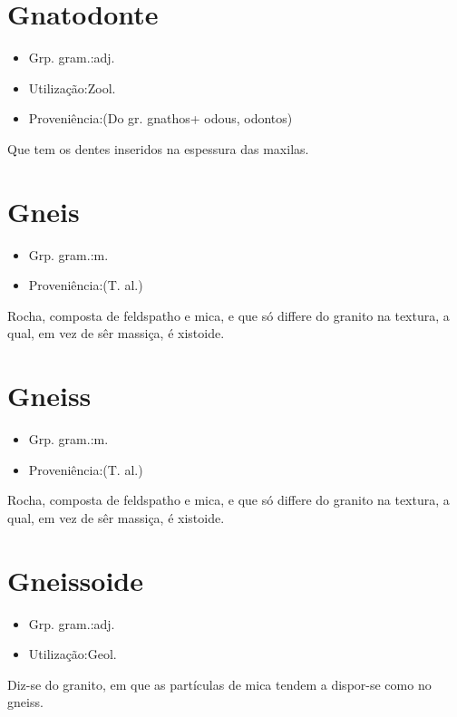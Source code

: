 \section{Gnatodonte}
\begin{itemize}
\item {Grp. gram.:adj.}
\end{itemize}
\begin{itemize}
\item {Utilização:Zool.}
\end{itemize}
\begin{itemize}
\item {Proveniência:(Do gr. \textunderscore gnathos\textunderscore  + \textunderscore odous\textunderscore , \textunderscore odontos\textunderscore )}
\end{itemize}
Que tem os dentes inseridos na espessura das maxilas.
\section{Gneis}
\begin{itemize}
\item {Grp. gram.:m.}
\end{itemize}
\begin{itemize}
\item {Proveniência:(T. al.)}
\end{itemize}
Rocha, composta de feldspatho e mica, e que só differe do granito na textura, a qual, em vez de sêr massiça, é xistoide.
\section{Gneiss}
\begin{itemize}
\item {Grp. gram.:m.}
\end{itemize}
\begin{itemize}
\item {Proveniência:(T. al.)}
\end{itemize}
Rocha, composta de feldspatho e mica, e que só differe do granito na textura, a qual, em vez de sêr massiça, é xistoide.
\section{Gneissoide}
\begin{itemize}
\item {Grp. gram.:adj.}
\end{itemize}
\begin{itemize}
\item {Utilização:Geol.}
\end{itemize}
Diz-se do granito, em que as partículas de mica tendem a dispor-se como no gneiss.
